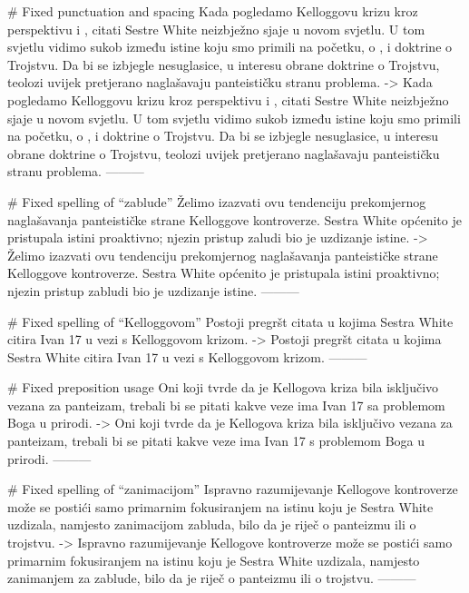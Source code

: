 # Fixed punctuation and spacing
Kada pogledamo Kelloggovu krizu kroz perspektivu  i , citati Sestre White neizbježno sjaje u novom svjetlu. U tom svjetlu vidimo sukob između istine koju smo primili na početku, o , i doktrine o Trojstvu. Da bi se izbjegle nesuglasice, u interesu obrane doktrine o Trojstvu, teolozi uvijek pretjerano naglašavaju panteističku stranu problema.
->
Kada pogledamo Kelloggovu krizu kroz perspektivu  i , citati Sestre White neizbježno sjaje u novom svjetlu. U tom svjetlu vidimo sukob između istine koju smo primili na početku, o , i doktrine o Trojstvu. Da bi se izbjegle nesuglasice, u interesu obrane doktrine o Trojstvu, teolozi uvijek pretjerano naglašavaju panteističku stranu problema.
---------

# Fixed spelling of “zablude”
Želimo izazvati ovu tendenciju prekomjernog naglašavanja panteističke strane Kelloggove kontroverze. Sestra White općenito je pristupala istini proaktivno; njezin pristup zaludi bio je uzdizanje istine.
->
Želimo izazvati ovu tendenciju prekomjernog naglašavanja panteističke strane Kelloggove kontroverze. Sestra White općenito je pristupala istini proaktivno; njezin pristup zabludi bio je uzdizanje istine.
---------

# Fixed spelling of “Kelloggovom”
Postoji pregršt citata u kojima Sestra White citira Ivan 17 u vezi s Kelloggovom krizom.
->
Postoji pregršt citata u kojima Sestra White citira Ivan 17 u vezi s Kelloggovom krizom.
---------

# Fixed preposition usage
Oni koji tvrde da je Kellogova kriza bila isključivo vezana za panteizam, trebali bi se pitati kakve veze ima Ivan 17 sa problemom Boga u prirodi.
->
Oni koji tvrde da je Kellogova kriza bila isključivo vezana za panteizam, trebali bi se pitati kakve veze ima Ivan 17 s problemom Boga u prirodi.
---------

# Fixed spelling of “zanimacijom”
Ispravno razumijevanje Kellogove kontroverze može se postići samo primarnim fokusiranjem na istinu koju je Sestra White uzdizala, namjesto zanimacijom zabluda, bilo da je riječ o panteizmu ili o trojstvu.
->
Ispravno razumijevanje Kellogove kontroverze može se postići samo primarnim fokusiranjem na istinu koju je Sestra White uzdizala, namjesto zanimanjem za zablude, bilo da je riječ o panteizmu ili o trojstvu.
---------